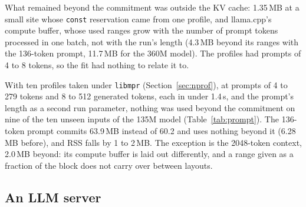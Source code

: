 \documentclass[11pt]{article}
\newcommand{\libmpr}{\texttt{libmpr}}
\newcommand{\secref}[1]{Section~\ref{#1}}
\newcommand{\tabref}[1]{Table~\ref{#1}}
\begin{document}
What remained beyond the commitment was outside the KV cache: 1.35\,MB at a small site whose \texttt{const}
reservation came from one profile, and llama.cpp's compute buffer, whose used ranges grow with the number of
prompt tokens processed in one batch, not with the run's length (4.3\,MB beyond its ranges with the 136-token
prompt, 11.7\,MB for the 360M model). The profiles had prompts of 4 to 8 tokens, so the fit had nothing to relate
it to.

\begin{table}[t]
\centering\small

\caption{llama.cpp 135M on its unseen inputs: the periodic reservations on \texttt{tokens} from four Pin profiles,
against reservations from ten \libmpr{} profiles (\secref{sec:nprof}) with prompts of 4 to 279 tokens and 8 to 512
tokens generated, fitted on \texttt{tokens} and \texttt{prompt} (the KV cache periodic on tokens, the compute buffer
\texttt{ranges} on the prompt). Mean of 3 runs, interleaved with glibc; every output identical.}
\label{tab:prompt}
\end{table}

With ten profiles taken under \libmpr{} (\secref{sec:nprof}), at prompts of 4 to 279 tokens and 8 to 512 generated
tokens, each in under 1.4\,s, and the prompt's length as a second run parameter, nothing was used beyond the
commitment on nine of the ten unseen inputs of the 135M model (\tabref{tab:prompt}). The 136-token prompt commits
63.9\,MB instead of 60.2 and uses nothing beyond it (6.28\,MB before), and RSS falls by 1 to 2\,MB. The exception is
the 2048-token context, 2.0\,MB beyond: its compute buffer is laid out differently, and a range given as a fraction
of the block does not carry over between layouts.

\subsection{An LLM server}
\label{sec:server}

\begin{table}[t]
\centering\small

\caption{llama.cpp serving concurrent clients (its parallel example: continuous batching, 8 requests per client, a
shared system prompt, greedy decoding), under glibc and under \libmpr{} with reservations from \libmpr{}'s own
profile of a smaller load (2 clients, 8 requests). Peak RSS and commit, mean of 3 runs; Time: \libmpr{}'s run time
over glibc's; Outputs: every request's prompt and response token counts, the same in all six runs.}
\label{tab:server}
\end{table}
\end{document}
